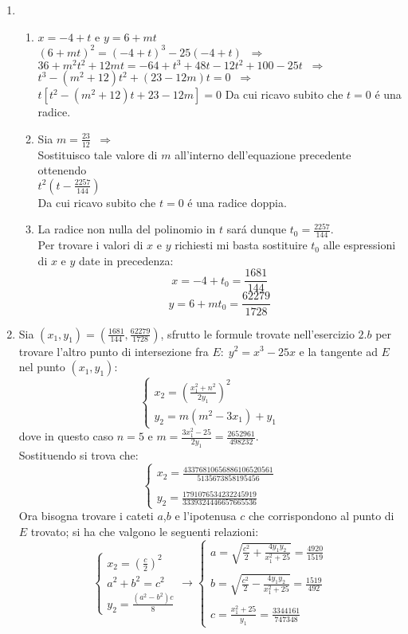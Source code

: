 \documentclass[a4paper]{article}
\newcommand{\sist}{\begin{cases}}
\newcommand{\esist}{\end{cases}}
\newcommand{\ds}{\displaystyle}
\begin{document}
\begin{enumerate}
\item \begin{enumerate}
\item $x=-4+t$ e $y=6+mt$\\
$(6+mt)^2=(-4+t)^3-25(-4+t)\;\;\Rightarrow\;\;$\\
$36+m^2t^2+12mt=-64+t^3+48t-12t^2+100-25t\;\;\Rightarrow\;\;$\\
$t^3-(m^2+12)t^2+(23-12m)t=0\;\;\Rightarrow\;\;$\\
$t[t^2-(m^2+12)t+23-12m]=0$
Da cui ricavo subito che $t=0$ \'e una radice.\\
\item Sia $m=\ds{\frac{23}{12}}\;\;\Rightarrow\;\;$\\
Sostituisco tale valore di $m$ all'interno dell'equazione precedente ottenendo\\
$ t^2(t-\ds{\frac{2257}{144}})$\\
Da cui ricavo subito che $t=0$ \'e una radice doppia.
\item La radice non nulla del polinomio in $t$ sar\'a dunque $t_0=\ds{\frac{2257}{144}}$.\\
Per trovare i valori di $x$ e $y$ richiesti mi basta sostituire $t_0$ alle espressioni di $x$ e $y$ date in precedenza:\\
$$x=-4+t_0=\ds{\frac{1681}{144}}$$
$$y=6+mt_0=\ds{\frac{62279}{1728}}$$
\end{enumerate}


\item Sia $(x_1,y_1)=\ds{\left(\frac{1681}{144},\frac{62279}{1728}\right)}$, sfrutto le formule trovate nell'esercizio $2.b$ per trovare l'altro punto di intersezione fra $E:\;y^2=x^3-25x$ e la tangente ad $E$ nel punto $(x_1,y_1)$:
$$\sist
x_2=\left(\frac{x_1^2+n^2}{2y_1}\right)^2 \\
y_2=m(m^2-3x_1)+y_1
\esist$$
dove in questo caso $n=5$ e $m=\ds{\frac{3x_1^2-25}{2y_1}=\frac{2652961}{498232}}$.\\
Sostituendo si trova che:\\
$$\sist
x_2=\ds{\frac{43376810656886106520561}{5135673858195456}}\\ \\
y_2=\ds{\frac{1791076534232245919}{3339324446657665536}}
\esist$$
Ora bisogna trovare i cateti $a$,$b$ e l'ipotenusa $c$ che corrispondono al punto di $E$ trovato; si ha che valgono le seguenti relazioni:
$$\sist 
x_2=\ds{\left(\frac{c}{2}\right)^2}\\ 
a^2+b^2=c^2\\
y_2=\ds{\frac{(a^2-b^2)c}{8}}
\esist 
\longrightarrow
\sist
a=\ds{\sqrt{\frac{c^2}{2}+\frac{4y_1y_2}{x_1^2+25}}=\frac{4920}{1519}}\\ \\
b=\ds{\sqrt{\frac{c^2}{2}-\frac{4y_1y_2}{x_1^2+25}}=\frac{1519}{492}}\\ \\
c=\ds{\frac{x_1^2+25}{y_1}=\frac{3344161}{747348}}
\esist
$$


\end{enumerate}
\end{document}
